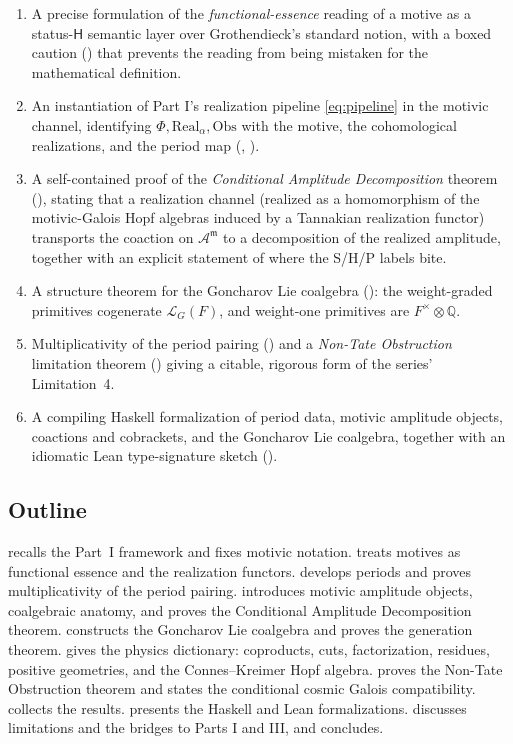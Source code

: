\documentclass[12pt]{article}
\theoremstyle{definition}
\theoremstyle{remark}
\newcommand{\Real}{\mathrm{Real}}
\newcommand{\Obs}{\mathrm{Obs}}
\newcommand{\Amm}{\mathcal{A}^{\mathfrak{m}}}
\newcommand{\LG}{\mathcal{L}_{G}}
\newcommand{\Qbb}{\mathbb{Q}}
\newcommand{\Hlab}{\ensuremath{\mathsf{H}}}
\begin{document}
\begin{enumerate}[leftmargin=1.6em]
\item A precise formulation of the \emph{functional-essence} reading of a motive as a
status-\Hlab{} semantic layer over Grothendieck's standard notion, with a boxed caution
() that prevents the reading from being mistaken for the
mathematical definition.
\item An instantiation of Part I's realization pipeline \eqref{eq:pipeline} in the motivic
channel, identifying $\Phi,\Real_\alpha,\Obs$ with the motive, the cohomological
realizations, and the period map (, ).
\item A self-contained proof of the \emph{Conditional Amplitude Decomposition} theorem
(), stating that a realization channel (realized as a homomorphism of the
motivic-Galois Hopf algebras induced by a Tannakian realization functor) transports the
coaction on $\Amm$ to a decomposition of the realized amplitude, together with an explicit
statement of where the S/H/P labels bite.
\item A structure theorem for the Goncharov Lie coalgebra (): the
weight-graded primitives cogenerate $\LG(F)$, and weight-one primitives are $F^\times\otimes\Qbb$.
\item Multiplicativity of the period pairing () and a
\emph{Non-Tate Obstruction} limitation theorem () giving a citable,
rigorous form of the series' Limitation~4.
\item A compiling Haskell formalization of period data, motivic amplitude objects,
coactions and cobrackets, and the Goncharov Lie coalgebra, together with an idiomatic Lean
type-signature sketch ().
\end{enumerate}

\subsection{Outline}
 recalls the Part~I framework and fixes motivic notation.
 treats motives as functional essence and the realization functors.
 develops periods and proves multiplicativity of the period pairing.
 introduces motivic amplitude objects, coalgebraic anatomy, and proves
the Conditional Amplitude Decomposition theorem.
 constructs the Goncharov Lie coalgebra and proves the generation
theorem.
 gives the physics dictionary: coproducts, cuts, factorization, residues,
positive geometries, and the Connes--Kreimer Hopf algebra.
 proves the Non-Tate Obstruction theorem and states the conditional cosmic
Galois compatibility.
 collects the results.
 presents the Haskell and Lean formalizations.
 discusses limitations and the bridges to Parts I and III, and
 concludes.
\end{document}
